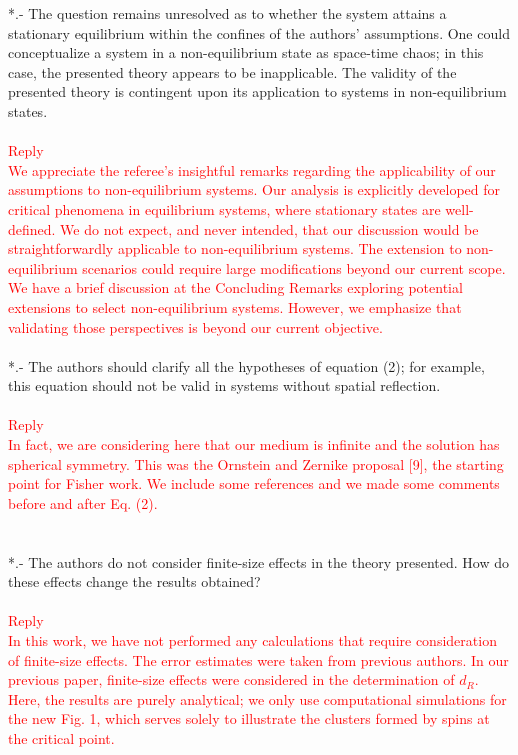 \documentclass[prd,aps,nofootinbib]{revtex4}
\begin{document}
*.- The question remains unresolved as to whether the system attains a stationary equilibrium within the confines of the authors' assumptions. One could conceptualize a system in a non-equilibrium state as space-time chaos; in this case, the presented theory appears to be inapplicable. The validity of the presented theory is contingent upon its application to systems in non-equilibrium states.\\
\\
\textcolor{red}{Reply}\\
\textcolor{red}{We appreciate the referee's insightful remarks regarding the applicability of our assumptions to non-equilibrium systems. Our analysis is explicitly developed for critical phenomena in equilibrium systems, where stationary states are well-defined. We do not expect, and never intended, that our discussion would be straightforwardly applicable to non-equilibrium systems. The extension to non-equilibrium scenarios could require large modifications beyond our current scope. We have a brief discussion at the Concluding Remarks exploring potential extensions to select non-equilibrium systems. However, we emphasize that validating those perspectives is beyond our current objective.%
}\\
\\


*.- The authors should clarify all the hypotheses of equation (2); for
example, this equation should not be valid in systems without spatial
reflection.\\
\\
\textcolor{red}{Reply}\\
\textcolor{red}{In fact, we are considering here that our medium is infinite and the solution has spherical symmetry.  This was the Ornstein and Zernike proposal [9], the starting point for Fisher work. We include some references and we made some comments before and after Eq. (2).  }\\
\\
\\
*.- The authors do not consider finite-size effects in the theory
presented. How do these effects change the results obtained?\\
\\
\textcolor{red}{Reply}\\
\textcolor{red}{ In this work, we have not performed any calculations that require consideration of finite-size effects. The error estimates were taken from previous authors. In our previous paper, finite-size effects were considered in the determination of $d_R$. Here, the results are purely analytical; we only use computational simulations for the new Fig. 1, which serves solely to illustrate the clusters formed by spins at the critical point.}\\
\\
\end{document}
